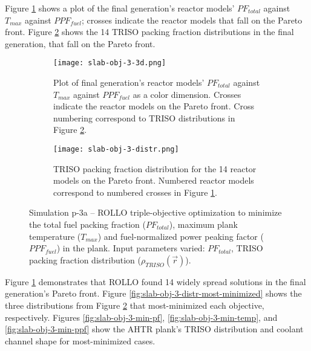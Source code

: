 Figure \ref{fig:slab-obj-3-3d} shows a plot of the final generation's reactor models' 
$PF_{total}$ against $T_{max}$ against $PPF_{fuel}$; crosses 
indicate the reactor models that fall on the Pareto front.
Figure \ref{fig:slab-obj-3-distr} shows the 14 TRISO packing fraction distributions in 
the final generation, that fall on the Pareto front. 
\begin{figure}[htbp!]
    \begin{subfigure}{\textwidth}
        \centering
        \texttt{[image: slab-obj-3-3d.png]}
        \caption{Plot of final generation's reactor models' $PF_{total}$ against 
        $T_{max}$ against $PPF_{fuel}$ as a color dimension. 
        Crosses indicate the reactor models on the Pareto front. 
        Cross numbering correspond to TRISO distributions in Figure 
        \ref{fig:slab-obj-3-distr}.}
        \label{fig:slab-obj-3-3d} 
    \end{subfigure}
    \begin{subfigure}{\textwidth}
        \texttt{[image: slab-obj-3-distr.png]}
        \caption{TRISO packing fraction distribution for the 14 reactor models on the 
        Pareto front. Numbered reactor models correspond to numbered crosses in Figure 
        \ref{fig:slab-obj-3-3d}.}
        \label{fig:slab-obj-3-distr} 
    \end{subfigure}
    \caption{Simulation p-3a -- ROLLO triple-objective optimization to minimize the total 
    fuel packing fraction ($PF_{total}$), maximum plank temperature ($T_{max}$) and 
    fuel-normalized power peaking factor ($PPF_{fuel}$) in the plank. 
    Input parameters varied: $PF_{total}$, TRISO packing fraction distribution
    ($\rho_{TRISO}(\vec{r})$).}
    \label{fig:slab-obj-3}
\end{figure}
Figure \ref{fig:slab-obj-3-3d} demonstrates that \gls{ROLLO} found 14 widely spread 
solutions in the final generation's Pareto front.  
Figure \ref{fig:slab-obj-3-distr-most-minimized} shows the three distributions from 
Figure \ref{fig:slab-obj-3-distr} that most-minimized each objective, respectively. 
Figures \ref{fig:slab-obj-3-min-pf}, \ref{fig:slab-obj-3-min-temp}, and 
\ref{fig:slab-obj-3-min-ppf} show the \gls{AHTR} plank's TRISO distribution and 
coolant channel shape for most-minimized cases. 
